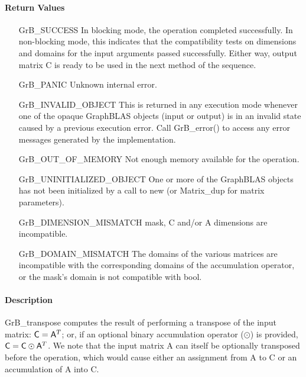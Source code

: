 \paragraph{Return Values}

\begin{itemize}[leftmargin=2.1in]
    \item[{\sf GrB\_SUCCESS}]         In blocking mode, the operation completed
    successfully. In non-blocking mode, this indicates that the compatibility 
    tests on dimensions and domains for the input arguments passed successfully. 
    Either way, output matrix {\sf C} is ready to be used in the next method of
    the sequence.

    \item[{\sf GrB\_PANIC}]           Unknown internal error.

    \item[{\sf GrB\_INVALID\_OBJECT}] This is returned in any execution mode 
    whenever one of the opaque GraphBLAS objects (input or output) is in an invalid 
    state caused by a previous execution error.  Call {\sf GrB\_error()} to access 
    any error messages generated by the implementation.

    \item[{\sf GrB\_OUT\_OF\_MEMORY}] Not enough memory available for the operation.

    \item[{\sf GrB\_UNINITIALIZED\_OBJECT}] One or more of the GraphBLAS objects 
    has not been initialized by a call to {\sf new} (or {\sf Matrix\_dup} for matrix
    parameters).

    \item[{\sf GrB\_DIMENSION\_MISMATCH}]  {\sf mask}, {\sf C} and/or {\sf A} 
    dimensions are incompatible.

    \item[{\sf GrB\_DOMAIN\_MISMATCH}]    The domains of the various matrices are
    incompatible with the corresponding domains of the 
    accumulation operator, or the mask's domain is not compatible with {\sf bool}.
\end{itemize}

\paragraph{Description}

{\sf GrB\_transpose} computes the result of performing a transpose of the input matrix:
${\sf C} = {\sf A}^T$; or, if an optional binary accumulation 
operator ($\odot$) is provided, ${\sf C} = {\sf C} \odot {\sf A}^T$.  
We note that the input matrix {\sf A} can itself be optionally transposed before the operation,
which would cause either an assignment from {\sf A} to {\sf C} or an
accumulation of {\sf A} into {\sf C}.

